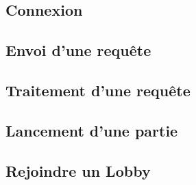 \documentclass{article}
\begin{document}
\subsection{Connexion}

\subsection{Envoi d'une requête}

\subsection{Traitement d'une requête}

\subsection{Lancement d'une partie}

\subsection{Rejoindre un Lobby}
\end{document}
